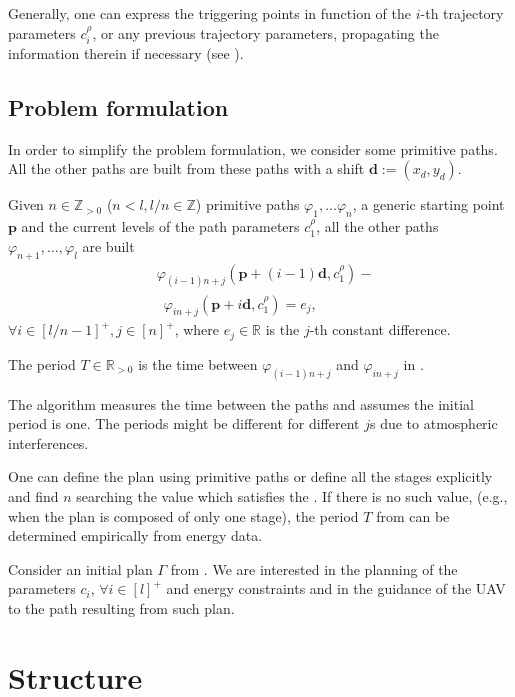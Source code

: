 Generally, one can express the triggering points in function of the $i$-th trajectory parameters $c_{i}^{\rho}$, or any previous trajectory parameters, propagating the information therein if necessary (see ).
   

\subsection{Problem formulation}

In order to simplify the problem formulation, we consider some primitive paths. All the other paths are built from these paths with a shift $\mathbf{d}:=(x_d,y_d)$.

Given $n\in\mathbb{Z}_{>0}$ ($n<l,l/n\in\mathbb{Z}$) primitive paths $\varphi_1,\dots\varphi_n$, a generic starting point $\mathbf{p}$ and the current levels of the path parameters $c_1^\rho$, all the other paths $\varphi_{n+1},\dots,\varphi_l$ are built
\begin{equation}\label{eq:primitive}\begin{split}
  &\varphi_{(i-1)n+j}(\mathbf{p}+(i-1)\mathbf{d},c_1^\rho)-\\ &\,\,\,\varphi_{in+j}(\mathbf{p}+i\mathbf{d},c_1^\rho)=e_j,
\end{split}\end{equation}
$\forall i\in[l/n-1]^+,j\in[n]^+$, where $e_j\in\mathbb{R}$ is the $j$-th constant difference.

\begin{highlight}
\begin{defn}[Period]\label{def:period}
  The period $T\in\mathbb{R}_{> 0}$ is the time between $\varphi_{(i-1)n+j}$ and $\varphi_{in+j}$ in .
\end{defn} 
\end{highlight}

The algorithm measures the time between the paths and assumes the initial period is one. The periods might be different for different $j$s due to atmospheric interferences.

One can define the plan using primitive paths or define all the stages explicitly and find $n$ searching the value which satisfies the . If there is no such value, (e.g., when the plan is composed of only one stage), the period $T$ from  can be determined empirically from energy data.

\begin{highlight}
\begin{pb}\label{pb}
  Consider an initial plan $\Gamma$ from . We are interested in the planning of the parameters $c_i,\,\forall i\in[l]^+$ and energy constraints and in the guidance of the UAV to the path resulting from such plan.
\end{pb}    
\end{highlight}

\section{Structure}

